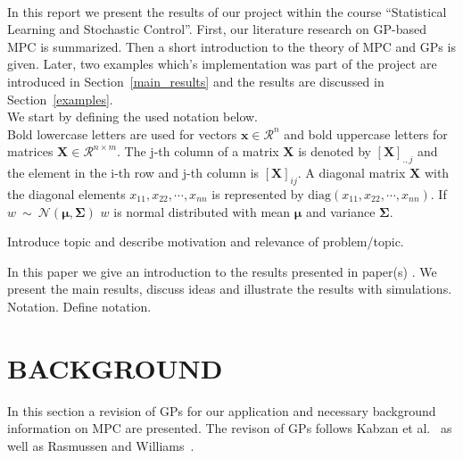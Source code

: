 \documentclass[letterpaper, 10 pt, conference]{ieeeconf}  %
\begin{document}
 \\
In this report we present the results of our project within the course ``Statistical Learning and Stochastic Control''. First, our literature research on GP-based MPC is summarized. Then a short introduction to the theory of MPC and GPs is given. Later, two examples which's  implementation was part of the project are introduced in Section~\ref{main_results} and the results are discussed in Section~\ref{examples}.\\
We start by defining the used notation below.\\
Bold lowercase letters are used for vectors $\boldsymbol{x} \in \mathcal{R}^n$ and bold uppercase letters for matrices $\boldsymbol{X} \in \mathcal{R}^{n \times m}$. The j-th column of a matrix $\boldsymbol{X}$ is denoted by $[\boldsymbol{X}]_{.,j}$ and the element in the i-th row and j-th column is $[\boldsymbol{X}]_{ij}$. A diagonal matrix $\boldsymbol{X}$ with the diagonal elements $x_{11}, x_{22}, \cdots, x_{nn}$ is represented by $\text{diag}(x_{11}, x_{22}, \cdots, x_{nn})$. If ${w}~\sim~\mathcal{N}(\boldsymbol{\mu},\boldsymbol{\Sigma})$ $w$ is normal distributed with mean $\boldsymbol{\mu}$ and variance $\boldsymbol{\Sigma}$.

Introduce topic and describe motivation and relevance of problem/topic.

In this paper we give an introduction to the results presented in paper(s) \cite{Bro-14}.
We present the main results, discuss ideas and illustrate the results with simulations.\\

Notation. Define notation.

\section{BACKGROUND}
In this section a revision of GPs for our application and necessary background information on MPC are presented. The revison of GPs follows Kabzan et al.~\cite{kabzan2019learning} as well as Rasmussen and Williams~\cite{williams2006gaussian}. \\
\end{document}
